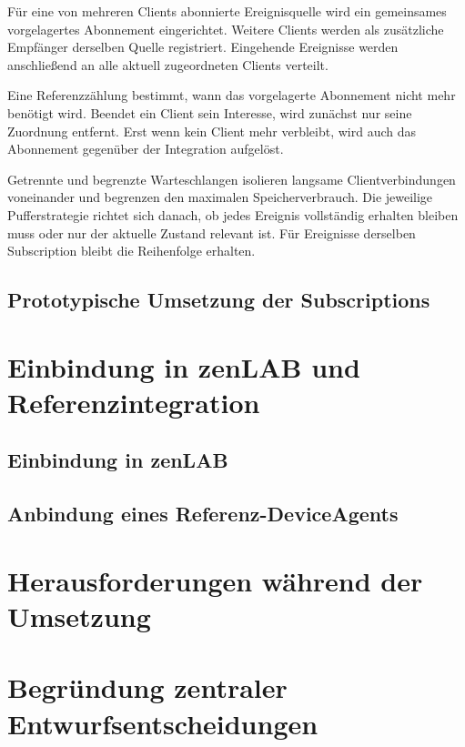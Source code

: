 Für eine von mehreren Clients abonnierte Ereignisquelle wird ein gemeinsames vorgelagertes Abonnement eingerichtet. Weitere Clients werden als zusätzliche Empfänger derselben Quelle registriert. Eingehende Ereignisse werden anschließend an alle aktuell zugeordneten Clients verteilt.

Eine Referenzzählung bestimmt, wann das vorgelagerte Abonnement nicht mehr benötigt wird. Beendet ein Client sein Interesse, wird zunächst nur seine Zuordnung entfernt. Erst wenn kein Client mehr verbleibt, wird auch das Abonnement gegenüber der Integration aufgelöst.

Getrennte und begrenzte Warteschlangen isolieren langsame Clientverbindungen voneinander und begrenzen den maximalen Speicherverbrauch. Die jeweilige Pufferstrategie richtet sich danach, ob jedes Ereignis vollständig erhalten bleiben muss oder nur der aktuelle Zustand relevant ist. Für Ereignisse derselben Subscription bleibt die Reihenfolge erhalten.

\subsection{Prototypische Umsetzung der Subscriptions}

\section{Einbindung in zenLAB und Referenzintegration}

\subsection{Einbindung in zenLAB}

\subsection{Anbindung eines Referenz-DeviceAgents}

\section{Herausforderungen während der Umsetzung}

\section{Begründung zentraler Entwurfsentscheidungen}
